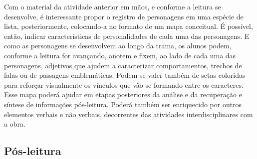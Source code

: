 \documentclass[12pt]{extarticle}
\begin{document}
Com o material da atividade anterior em mãos, e conforme a
leitura se desenvolve, é interessante propor o registro de personagens
em uma espécie de lista, posteriormente, colocando-a no formato de um
mapa conceitual. É possível, então, indicar características de
personalidades de cada uma das personagens. E como as personagens se
desenvolvem ao longo da trama, os alunos podem, conforme a leitura for
avançando, anotem e fixem, ao lado de cada uma das personagens,
adjetivos que ajudem a caracterizar comportamentos, trechos de falas ou
de passagens emblemáticas. Podem se valer também de setas coloridas para
reforçar visualmente os vínculos que vão se formando entre os
caracteres. Esse mapa poderá ajudar em etapas posteriores da análise e
da recuperação e síntese de informações pós-leitura. Poderá também ser
enriquecido por outros elementos verbais e não verbais, decorrentes das
atividades interdisciplinares com a obra.

\subsection{Pós-leitura}


\end{document}
